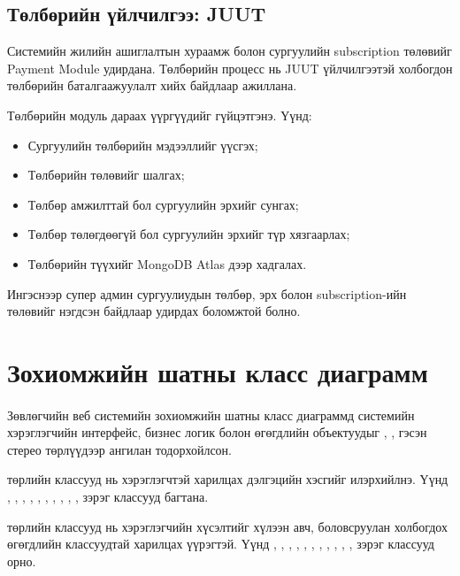 \subsection*{Төлбөрийн үйлчилгээ: JUUT}

Системийн жилийн ашиглалтын хураамж болон сургуулийн subscription
төлөвийг Payment Module удирдана. Төлбөрийн процесс нь JUUT
үйлчилгээтэй холбогдон төлбөрийн баталгаажуулалт хийх байдлаар
ажиллана.

Төлбөрийн модуль дараах үүргүүдийг гүйцэтгэнэ. Үүнд:

\begin{itemize}
    \item Сургуулийн төлбөрийн мэдээллийг үүсгэх;
    \item Төлбөрийн төлөвийг шалгах;
    \item Төлбөр амжилттай бол сургуулийн эрхийг сунгах;
    \item Төлбөр төлөгдөөгүй бол сургуулийн эрхийг түр хязгаарлах;
    \item Төлбөрийн түүхийг MongoDB Atlas дээр хадгалах.
\end{itemize}

Ингэснээр супер админ сургуулиудын төлбөр, эрх болон subscription-ийн
төлөвийг нэгдсэн байдлаар удирдах боломжтой болно.

\section{Зохиомжийн шатны класс диаграмм}
\paragraph{}
Зөвлөгчийн веб системийн зохиомжийн шатны класс диаграммд
системийн хэрэглэгчийн интерфейс, бизнес логик болон өгөгдлийн
объектуудыг , ,  гэсэн
стерео төрлүүдээр ангилан тодорхойлсон.

 төрлийн классууд нь хэрэглэгчтэй харилцах дэлгэцийн
хэсгийг илэрхийлнэ. Үүнд , ,
, , ,
, ,
, ,
,  зэрэг классууд багтана.

 төрлийн классууд нь хэрэглэгчийн хүсэлтийг хүлээн авч,
боловсруулан холбогдох өгөгдлийн классуудтай харилцах үүрэгтэй.
Үүнд , , ,
, ,
, ,
, ,
, ,
 зэрэг классууд орно.

